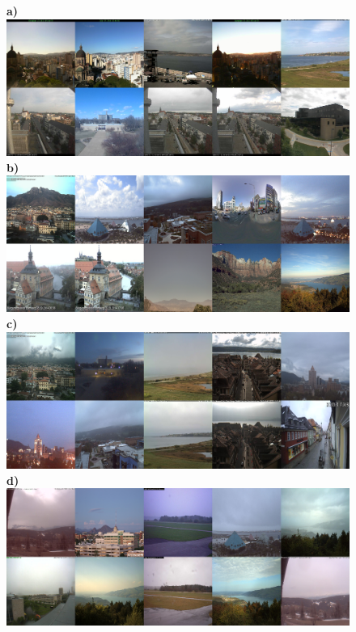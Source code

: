 \documentclass{article}
\begin{document}
\begin{figure}
\centering
\textbf{\scriptsize{a)}}\includegraphics[trim = 0mm 0mm 0mm 0mm,clip,scale=0.14]{Images/13-0_Mean_7_8_300_tiles.png}
\textbf{\scriptsize{b)}}\includegraphics[trim = 0mm 0mm 0mm 0mm,clip,scale=0.14]{Images/13-3_Mean_7_6_100_tiles.png}
\textbf{\scriptsize{c)}}\includegraphics[trim = 0mm 0mm 0mm 0mm,clip,scale=0.14]{Images/13-5_K-mean_6_tiles.png}
\textbf{\scriptsize{d)}}\includegraphics[trim = 0mm 0mm 0mm 0mm,clip,scale=0.14]{Images/13-9_Sobel_70_tiles.png}
\end{figure}
\clearpage %
\end{document}
